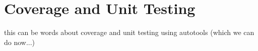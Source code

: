 %
%
\section{Coverage and Unit Testing}
\label{sec:coverunit}

this can be words about coverage and unit testing using autotools
(which we can do now...)

%
%
